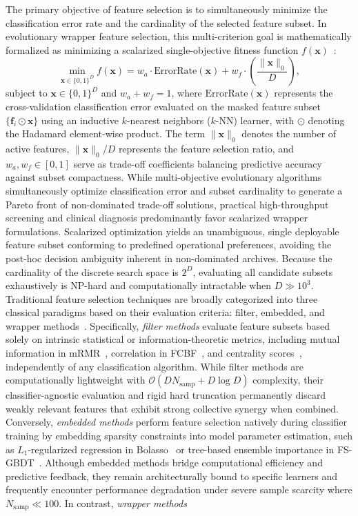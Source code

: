 \documentclass[final,5p,times,fleqn]{elsarticle}
\begin{document}
The primary objective of feature selection is to simultaneously minimize the classification error rate and the cardinality of the selected feature subset. In evolutionary wrapper feature selection, this multi-criterion goal is mathematically formalized as minimizing a scalarized single-objective fitness function $f(\mathbf{x})$~\cite{miao2024,deng2025nns}:
\begin{equation}
\min_{\mathbf{x} \in \{0, 1\}^D} f(\mathbf{x}) = w_a \cdot \mathrm{ErrorRate}(\mathbf{x}) + w_f \cdot \left(\frac{\|\mathbf{x}\|_0}{D}\right),
\label{eq:fs_formulation}
\end{equation}
subject to $\mathbf{x} \in \{0, 1\}^D$ and $w_a + w_f = 1$, where $\mathrm{ErrorRate}(\mathbf{x})$ represents the cross-validation classification error evaluated on the masked feature subset $\{\mathbf{f}_i \odot \mathbf{x}\}$ using an inductive $k$-nearest neighbors ($k\text{-NN}$) learner, with $\odot$ denoting the Hadamard element-wise product. The term $\|\mathbf{x}\|_0$ denotes the number of active features, $\|\mathbf{x}\|_0 / D$ represents the feature selection ratio, and $w_a, w_f \in [0, 1]$ serve as trade-off coefficients balancing predictive accuracy against subset compactness. While multi-objective evolutionary algorithms simultaneously optimize classification error and subset cardinality to generate a Pareto front of non-dominated trade-off solutions, practical high-throughput screening and clinical diagnosis predominantly favor scalarized wrapper formulations. Scalarized optimization yields an unambiguous, single deployable feature subset conforming to predefined operational preferences, avoiding the post-hoc decision ambiguity inherent in non-dominated archives. Because the cardinality of the discrete search space is $2^D$, evaluating all candidate subsets exhaustively is NP-hard and computationally intractable when $D \gg 10^3$. Traditional feature selection techniques are broadly categorized into three classical paradigms based on their evaluation criteria: filter, embedded, and wrapper methods~\cite{guyon2003,kohavi1997}. Specifically, \textit{filter methods} evaluate feature subsets based solely on intrinsic statistical or information-theoretic metrics, including mutual information in mRMR~\cite{peng2005}, correlation in FCBF~\cite{yu2003}, and centrality scores~\cite{roffo2016}, independently of any classification algorithm. While filter methods are computationally lightweight with $\mathcal{O}(D N_{\mathrm{samp}} + D \log D)$ complexity, their classifier-agnostic evaluation and rigid hard truncation permanently discard weakly relevant features that exhibit strong collective synergy when combined. Conversely, \textit{embedded methods} perform feature selection natively during classifier training by embedding sparsity constraints into model parameter estimation, such as $L_1$-regularized regression in Bolasso~\cite{bach2008} or tree-based ensemble importance in FS-GBDT~\cite{zhang2021fsgbdt}. Although embedded methods bridge computational efficiency and predictive feedback, they remain architecturally bound to specific learners and frequently encounter performance degradation under severe sample scarcity where $N_{\mathrm{samp}} \ll 100$. In contrast, \textit{wrapper methods} 
\end{document}
